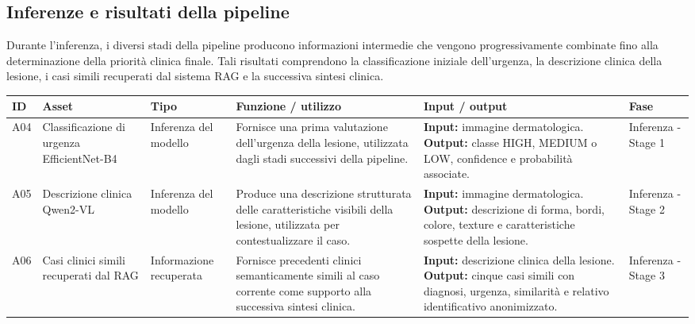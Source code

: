 \subsection{Inferenze e risultati della pipeline}
Durante l'inferenza, i diversi stadi della pipeline producono informazioni intermedie che vengono progressivamente combinate fino alla determinazione della priorità clinica finale. Tali risultati comprendono la classificazione iniziale dell'urgenza, la descrizione clinica della lesione, i casi simili recuperati dal sistema RAG e la successiva sintesi clinica.

\begin{table}[H]
    \centering
    \small
    \setlength{\tabcolsep}{4pt}
    \renewcommand{\arraystretch}{1.08}

    \begin{tabularx}{\textwidth}{
        >{\raggedright\arraybackslash}p{0.6cm}
        >{\raggedright\arraybackslash}p{2.5cm}
        >{\raggedright\arraybackslash}p{1.6cm}
        X
        X
        >{\raggedright\arraybackslash}p{1.8cm}
    }
        \toprule

        \textbf{ID} &
        \textbf{Asset} &
        \textbf{Tipo} &
        \textbf{Funzione / utilizzo} &
        \textbf{Input / output} &
        \textbf{Fase} \\

        \midrule

        A04 &
        Classificazione di urgenza EfficientNet-B4 &
        Inferenza del modello &
        Fornisce una prima valutazione dell'urgenza della lesione,
        utilizzata dagli stadi successivi della pipeline. &
        \textbf{Input:} immagine dermatologica.
        \textbf{Output:} classe HIGH, MEDIUM o LOW, confidence e
        probabilità associate. &
        Inferenza - Stage 1 \\

        \midrule

        A05 &
        Descrizione clinica Qwen2-VL &
        Inferenza del modello &
        Produce una descrizione strutturata delle caratteristiche
        visibili della lesione, utilizzata per contestualizzare il caso. &
        \textbf{Input:} immagine dermatologica.
        \textbf{Output:} descrizione di forma, bordi, colore, texture e
        caratteristiche sospette della lesione. &
        Inferenza - Stage 2 \\

        \midrule

        A06 &
        Casi clinici simili recuperati dal RAG &
        Informa\-zione recuperata &
        Fornisce precedenti clinici semanticamente simili al caso
        corrente come supporto alla successiva sintesi clinica. &
        \textbf{Input:} descrizione clinica della lesione.
        \textbf{Output:} cinque casi simili con diagnosi, urgenza,
        similarità e relativo identificativo anonimizzato. &
        Inferenza - Stage 3 \\


\end{tabularx}
\end{table}
